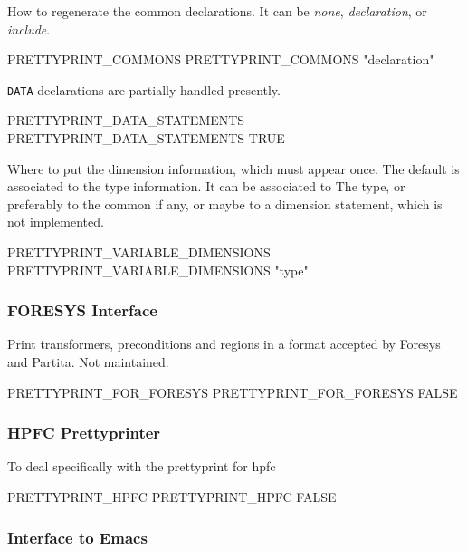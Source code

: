 \documentclass[a4paper]{report}
\begin{document}
How to regenerate the common declarations.
It can be \emph{none}, \emph{declaration}, or \emph{include}.

\begin{PipsProp}{PRETTYPRINT_COMMONS}
PRETTYPRINT_COMMONS "declaration"
\end{PipsProp}

\verb/DATA/ declarations are partially handled presently.

\begin{PipsProp}{PRETTYPRINT_DATA_STATEMENTS}
PRETTYPRINT_DATA_STATEMENTS TRUE
\end{PipsProp}

Where to put the dimension information, which must appear once.
The default is associated to the type information. It can be associated to
The type, or preferably to the common if any, or maybe to a dimension
statement, which is not implemented.

\begin{PipsProp}{PRETTYPRINT_VARIABLE_DIMENSIONS}
PRETTYPRINT_VARIABLE_DIMENSIONS "type"
\end{PipsProp}


\subsubsection{FORESYS Interface}

Print transformers, preconditions and regions in a format accepted by
Foresys and Partita. Not maintained.

\begin{PipsProp}{PRETTYPRINT_FOR_FORESYS}
PRETTYPRINT_FOR_FORESYS FALSE
\end{PipsProp}


\subsubsection{HPFC Prettyprinter}

To deal specifically with the prettyprint for hpfc

\begin{PipsProp}{PRETTYPRINT_HPFC}
PRETTYPRINT_HPFC FALSE
\end{PipsProp}


\subsubsection{Interface to Emacs}
\end{document}
